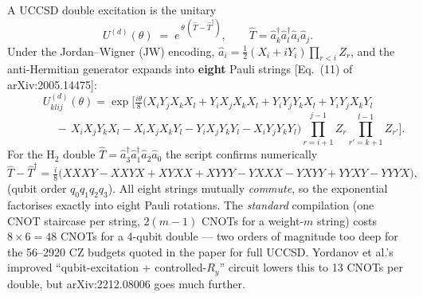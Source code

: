 \documentclass[11pt]{article}
\newcommand{\ad}[1]{\hat{a}^{\dagger}_{#1}}
\newcommand{\an}[1]{\hat{a}_{#1}}
\begin{document}
A UCCSD double excitation is the unitary
\begin{equation}
  U^{(d)}(\theta) \;=\; e^{\,\theta\,(\hat T - \hat T^{\dagger})},
  \qquad \hat T = \ad{k}\ad{l}\an{i}\an{j} .
\end{equation}
Under the Jordan--Wigner (JW) encoding,
$\an{i} = \tfrac12 (X_i + iY_i)\prod_{r<i} Z_r$, and the anti-Hermitian
generator expands into \textbf{eight} Pauli strings
[Eq.~(11) of arXiv:2005.14475]:
\begin{equation}
\label{eq:8strings}
U^{(d)}_{klij}(\theta)=\exp\!\Big[\tfrac{i\theta}{8}
\big(
 X_iY_jX_kX_l + Y_iX_jX_kX_l + Y_iY_jY_kX_l + Y_iY_jX_kY_l \nonumber
\end{equation}
\vspace{-2em}
\begin{equation}
 \qquad\qquad
 -\,X_iX_jY_kX_l - X_iX_jX_kY_l - Y_iX_jY_kY_l - X_iY_jY_kY_l
\big)\textstyle\prod_{r=i+1}^{j-1}\! Z_r \prod_{r'=k+1}^{l-1}\! Z_{r'}\Big].
\end{equation}
For the H$_2$ double $\hat T=\ad{3}\ad{1}\an{2}\an{0}$ the script confirms
numerically
\begin{equation}
  \hat T-\hat T^{\dagger}=\tfrac{i}{8}\big(
  XXXY - XXYX + XYXX + XYYY - YXXX - YXYY + YYXY - YYYX\big),
\end{equation}
(qubit order $q_0q_1q_2q_3$). All eight strings mutually \emph{commute}, so
the exponential factorises exactly into eight Pauli rotations. The
\emph{standard} compilation (one CNOT staircase per string,
$2(m-1)$ CNOTs for a weight-$m$ string) costs $8\times 6=48$ CNOTs for a
4-qubit double --- two orders of magnitude too deep for the 56--2920 CZ
budgets quoted in the paper for full UCCSD. Yordanov et al.'s improved
``qubit-excitation + controlled-$R_y$'' circuit lowers this to 13 CNOTs per
double, but arXiv:2212.08006 goes much further.

\end{document}

